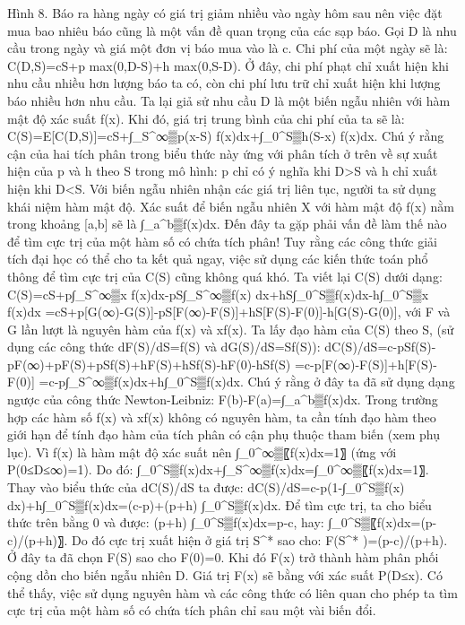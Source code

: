 \begin{multicols}{2}
	Hình 8. Báo ra hàng ngày có giá trị giảm nhiều vào ngày hôm sau nên việc đặt mua bao nhiêu báo cũng là một vấn đề quan trọng của các sạp báo.
	Gọi D là nhu cầu trong ngày và giá một đơn vị báo mua vào là c. Chi phí của một ngày sẽ là:
	C(D,S)=cS+p max⁡(0,D-S)+h max⁡(0,S-D).
	Ở đây, chi phí phạt chỉ xuất hiện khi nhu cầu nhiều hơn lượng báo ta có, còn chi phí lưu trữ chỉ xuất hiện khi lượng báo nhiều hơn nhu cầu.
	Ta lại giả sử nhu cầu D là một biến ngẫu nhiên với hàm mật độ xác suất f(x). Khi đó, giá trị trung bình của chi phí của ta sẽ là:
	C(S)=E[C(D,S)]=cS+∫_S^∞▒p(x-S)  f(x)dx+∫_0^S▒h(S-x)  f(x)dx.
	Chú ý rằng cận của hai tích phân trong biểu thức này ứng với phân tích ở trên về sự xuất hiện của p và h theo S trong mô hình: p chỉ có ý nghĩa khi D>S và h chỉ xuất hiện khi D<S.
	Với biến ngẫu nhiên nhận các giá trị liên tục, người ta sử dụng khái niệm hàm mật độ. Xác suất để biến ngẫu nhiên X với hàm mật độ f(x) nằm trong khoảng [a,b] sẽ là ∫_a^b▒f(x)dx.
	Đến đây ta gặp phải vấn đề làm thế nào để tìm cực trị của một hàm số có chứa tích phân! Tuy rằng các công thức giải tích đại học có thể cho ta kết quả ngay, việc sử dụng các kiến thức toán phổ thông để tìm cực trị của C(S) cũng không quá khó. Ta viết lại C(S) dưới dạng:
	C(S)=cS+p∫_S^∞▒x f(x)dx-pS∫_S^∞▒f(x)  dx+hS∫_0^S▒f(x)dx-h∫_0^S▒x f(x)dx
	=cS+p[G(∞)-G(S)]-pS[F(∞)-F(S)]+hS[F(S)-F(0)]-h[G(S)-G(0)],
	với F và G lần lượt là nguyên hàm của f(x) và xf(x).
	Ta lấy đạo hàm của C(S) theo S, (sử dụng các công thức dF(S)/dS=f(S) và dG(S)/dS=Sf(S)):
	dC(S)/dS=c-pSf(S)-pF(∞)+pF(S)+pSf(S)+hF(S)+hSf(S)-hF(0)-hSf(S)
	=c-p[F(∞)-F(S)]+h[F(S)-F(0)]
	=c-p∫_S^∞▒f(x)dx+h∫_0^S▒f(x)dx.
	Chú ý rằng ở đây ta đã sử dụng dạng ngược của công thức Newton-Leibniz: F(b)-F(a)=∫_a^b▒f(x)dx. Trong trường hợp các hàm số f(x) và xf(x) không có nguyên hàm, ta cần tính đạo hàm theo giới hạn để tính đạo hàm của tích phân có cận phụ thuộc tham biến (xem phụ lục).
	Vì f(x) là hàm mật độ xác suất nên ∫_0^∞▒〖f(x)dx=1〗 (ứng với P(0≤D≤∞)=1). Do đó:
	∫_0^S▒f(x)dx+∫_S^∞▒f(x)dx=∫_0^∞▒〖f(x)dx=1〗.
	Thay vào biểu thức của dC(S)/dS ta được:
	dC(S)/dS=c-p(1-∫_0^S▒f(x)  dx)+h∫_0^S▒f(x)dx=(c-p)+(p+h) ∫_0^S▒f(x)dx.
	Để tìm cực trị, ta cho biểu thức trên bằng 0 và được:
	(p+h) ∫_0^S▒f(x)dx=p-c,
	hay:
	∫_0^S▒〖f(x)dx=(p-c)/(p+h)〗.
	Do đó cực trị xuất hiện ở giá trị S^* sao cho:
	F(S^* )=(p-c)/(p+h).
	Ở đây ta đã chọn F(S) sao cho F(0)=0. Khi đó F(x) trở thành hàm phân phối cộng dồn cho biến ngẫu nhiên D. Giá trị F(x) sẽ bằng với xác suất P(D≤x).
	Có thể thấy, việc sử dụng nguyên hàm và các công thức có liên quan cho phép ta tìm cực trị của một hàm số có chứa tích phân chỉ sau một vài biến đổi.

\end{multicols}
